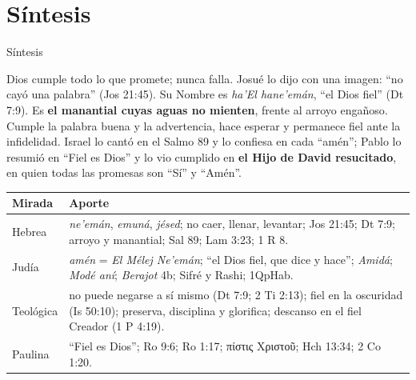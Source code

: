 \documentclass[hyperref={bookmarks=false},aspectratio=169]{beamer}
\newcommand{\grc}[1]{\foreignlanguage{ancientgreek}{#1}}
\newcommand{\destacar}[1]{\textbf{\textcolor{azul}{#1}}}
\begin{document}
\section{Síntesis}

\begin{frame}{Síntesis}
\begin{tcolorbox}[colback=papiro,colframe=azul,boxrule=1pt,arc=3pt]
\scriptsize Dios cumple todo lo que promete; nunca falla. Josué lo dijo con una imagen: ``no cayó una palabra'' (Jos 21:45). Su Nombre es \emph{ha'El hane'emán}, ``el Dios fiel'' (Dt 7:9). Es \destacar{el manantial cuyas aguas no mienten}, frente al arroyo engañoso. Cumple la palabra buena y la advertencia, hace esperar y permanece fiel ante la infidelidad. Israel lo cantó en el Salmo 89 y lo confiesa en cada ``amén''; Pablo lo resumió en ``Fiel es Dios'' y lo vio cumplido en \destacar{el Hijo de David resucitado}, en quien todas las promesas son ``Sí'' y ``Amén''.
\end{tcolorbox}
\fontsize{6.4}{7.6}\selectfont\renewcommand{\arraystretch}{1.1}
\begin{tabular}{@{}>{\RaggedRight\arraybackslash}p{1.6cm}>{\RaggedRight\arraybackslash}p{10.2cm}@{}}
\toprule
\textbf{Mirada} & \textbf{Aporte} \\ \midrule
Hebrea & \emph{ne'emán}, \emph{emuná}, \emph{jésed}; no caer, llenar, levantar; Jos 21:45; Dt 7:9; arroyo y manantial; Sal 89; Lam 3:23; 1 R 8. \\
Judía & \emph{amén} = \emph{El Mélej Ne'emán}; ``el Dios fiel, que dice y hace''; \emph{Amidá}; \emph{Modé aní}; \emph{Berajot} 4b; Sifré y Rashi; 1QpHab. \\
Teológica & no puede negarse a sí mismo (Dt 7:9; 2 Ti 2:13); fiel en la oscuridad (Is 50:10); preserva, disciplina y glorifica; descanso en el fiel Creador (1 P 4:19). \\
Paulina & ``Fiel es Dios''; Ro 9:6; Ro 1:17; \grc{πίστις Χριστοῦ}; Hch 13:34; 2 Co 1:20. \\
\bottomrule
\end{tabular}
\end{frame}
\end{document}
